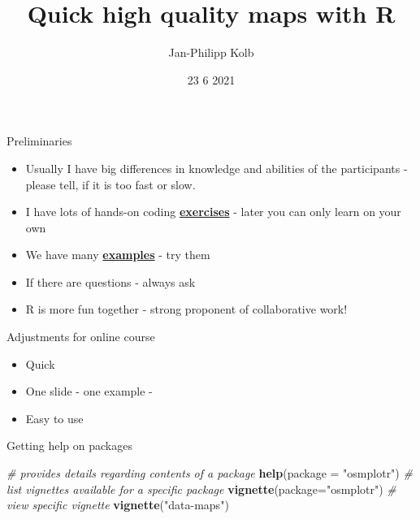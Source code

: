 \documentclass[
  ignorenonframetext,
]{beamer}
\title{Quick high quality maps with R}
\author{Jan-Philipp Kolb}
\date{23 6 2021}
\newenvironment{Shaded}{\begin{snugshade}}{\end{snugshade}}
\newcommand{\CommentTok}[1]{\textcolor[rgb]{0.56,0.35,0.01}{\textit{#1}}}
\newcommand{\DataTypeTok}[1]{\textcolor[rgb]{0.13,0.29,0.53}{#1}}
\newcommand{\KeywordTok}[1]{\textcolor[rgb]{0.13,0.29,0.53}{\textbf{#1}}}
\newcommand{\NormalTok}[1]{#1}
\newcommand{\StringTok}[1]{\textcolor[rgb]{0.31,0.60,0.02}{#1}}
\providecommand{\tightlist}{%
  \setlength{\itemsep}{0pt}\setlength{\parskip}{0pt}}
\begin{document}
\frame{\titlepage}

\begin{frame}{Preliminaries}
\protect\hypertarget{preliminaries}{}
\begin{itemize}
\tightlist
\item
  Usually I have big differences in knowledge and abilities of the
  participants - please tell, if it is too fast or slow.
\item
  I have lots of hands-on coding
  \href{http://web.math.ku.dk/~helle/R-intro/exercises.pdf}{\textbf{exercises}}
  - later you can only learn on your own
\item
  We have many \href{https://www.showmeshiny.com/}{\textbf{examples}} -
  try them
\item
  If there are questions - always ask
\item
  R is more fun together - strong proponent of collaborative work!
\end{itemize}
\end{frame}

\begin{frame}{Adjustments for online course}
\protect\hypertarget{adjustments-for-online-course}{}
\begin{itemize}
\tightlist
\item
  Quick
\item
  One slide - one example -
\item
  Easy to use
\end{itemize}
\end{frame}

\begin{frame}[fragile]{Getting help on packages}
\protect\hypertarget{getting-help-on-packages}{}
\begin{Shaded}
\begin{Highlighting}[]
\CommentTok{\# provides details regarding contents of a package}
\KeywordTok{help}\NormalTok{(}\DataTypeTok{package =} \StringTok{"osmplotr"}\NormalTok{)}
\CommentTok{\# list vignettes available for a specific package}
\KeywordTok{vignette}\NormalTok{(}\DataTypeTok{package=}\StringTok{"osmplotr"}\NormalTok{)}
\CommentTok{\# view specific vignette}
\KeywordTok{vignette}\NormalTok{(}\StringTok{"data{-}maps"}\NormalTok{)}
\end{Highlighting}
\end{Shaded}
\end{frame}
\end{document}
